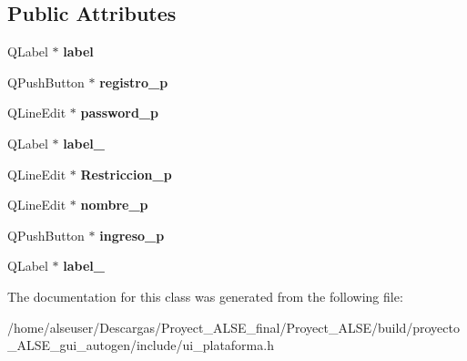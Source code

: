 \subsection*{Public Attributes}
\begin{DoxyCompactItemize}
\item 
\mbox{\label{class_ui__plataforma_a51da2e185c7ea1710fbde908f5106170}} 
Q\+Label $\ast$ {\bfseries label}
\item 
\mbox{\label{class_ui__plataforma_ab4df0b904987b2904c9f798389773758}} 
Q\+Push\+Button $\ast$ {\bfseries registro\+\_\+p}
\item 
\mbox{\label{class_ui__plataforma_aa33f7d9fce2a49ae56ac0d543c27e6ca}} 
Q\+Line\+Edit $\ast$ {\bfseries password\+\_\+p}
\item 
\mbox{\label{class_ui__plataforma_a07d674ab7e63711328b006cbe0b86a8d}} 
Q\+Label $\ast$ {\bfseries label\+\_}
\item 
\mbox{\label{class_ui__plataforma_aa14326d047614f6752e37fe81997024c}} 
Q\+Line\+Edit $\ast$ {\bfseries Restriccion\+\_\+p}
\item 
\mbox{\label{class_ui__plataforma_ae7fc2481ca0506b42228c381e01fd8a4}} 
Q\+Line\+Edit $\ast$ {\bfseries nombre\+\_\+p}
\item 
\mbox{\label{class_ui__plataforma_a8b852efa478ee8e28a7d92e9c1955b5e}} 
Q\+Push\+Button $\ast$ {\bfseries ingreso\+\_\+p}
\item 
\mbox{\label{class_ui__plataforma_ae4475a26e88351577bf11dabf3e4e45e}} 
Q\+Label $\ast$ {\bfseries label\+\_}
\end{DoxyCompactItemize}


The documentation for this class was generated from the following file\+:\begin{DoxyCompactItemize}
\item 
/home/alseuser/\+Descargas/\+Proyect\+\_\+\+A\+L\+S\+E\+\_\+final/\+Proyect\+\_\+\+A\+L\+S\+E/build/proyecto\+\_\+\+A\+L\+S\+E\+\_\+gui\+\_\+autogen/include/ui\+\_\+plataforma.\+h\end{DoxyCompactItemize}
